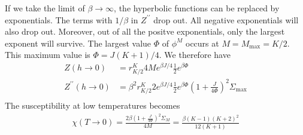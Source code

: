 \documentclass[12pt]{revtex4-2}
\begin{document}
If we take the limit of \(\beta \to \infty\), the hyperbolic functions can be replaced by exponentials. The terms with \(1/\beta\) in \(Z^{\prime\prime}\) drop out. All negative exponentials will also drop out. Moreover, out of all the positve exponentials, only the largest exponent will survive. The largest value \(\Phi\) of \(\phi^M\) occurs at \(M = M_\text{max} = K/2\). This maximum value is \(\Phi = J(K+1)/4\). We therefore have
\begin{align}
	     Z(h \to 0) &= r^K_{K/2} 4Me^{\beta J/4}\frac{1}{2}e^{\beta\Phi}\\
	     Z^{\prime\prime}(h \to 0) &=\beta^2 r^K_{K/2}2 e^{\beta J/4}\frac{1}{2}e^{\beta \Phi}\left(1 + \frac{J}{4\Phi}\right)^2\Sigma_\text{max}\\
\end{align}
The susceptibility at low temperatures becomes
\begin{align}
	\chi(T \to 0) = \frac{2\beta\left(1 + \frac{J}{4\Phi}\right)^2\Sigma_M}{4M} = \frac{\beta (K-1)(K+2)^2}{12(K+1)}
\end{align}
\end{document}
